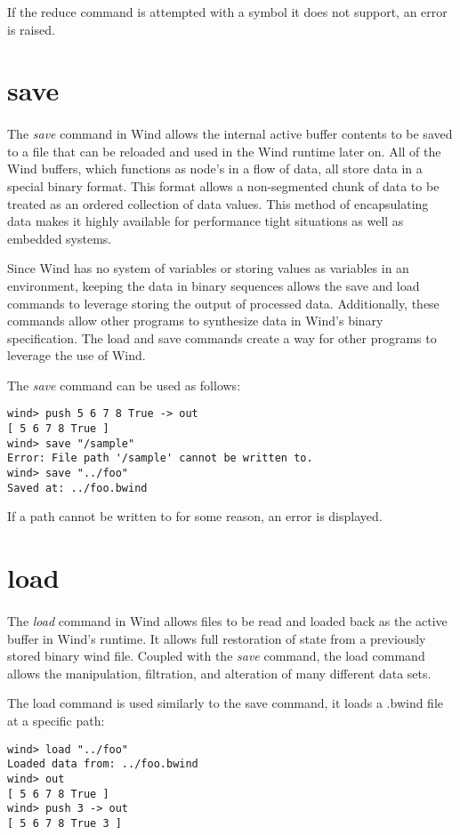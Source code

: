 \par If the reduce command is attempted with a symbol it does not support, an error is raised.

\section{save}

\paragraph{  } The \emph{save} command in Wind allows the internal active buffer contents to be saved to a file that can be reloaded and used in the Wind runtime later on. All of the Wind buffers, which functions as node's in a flow of data, all store data in a special binary format. This format allows a non-segmented chunk of data to be treated as an ordered collection of data values. This method of encapsulating data makes it highly available for performance tight situations as well as embedded systems.
\par Since Wind has no system of variables or storing values as variables in an environment, keeping the data in binary sequences allows the save and load commands to leverage storing the output of processed data. Additionally, these commands allow other programs to synthesize data in Wind's binary specification. The load and save commands create a way for other programs to leverage the use of Wind.
\par The \emph{save} command can be used as follows: \\

\begin{verbatim}
wind> push 5 6 7 8 True -> out
[ 5 6 7 8 True ]
wind> save "/sample"
Error: File path '/sample' cannot be written to.
wind> save "../foo"
Saved at: ../foo.bwind
\end{verbatim}

\par If a path cannot be written to for some reason, an error is displayed.

\section{load}

\paragraph{  } The \emph{load} command in Wind allows  files to be read and loaded back as the active buffer in Wind's runtime. It allows full restoration of state from a previously stored binary wind file. Coupled with the \emph{save} command, the load command allows the manipulation, filtration, and alteration of many different data sets. 
\par The load command is used similarly to the save command, it loads a .bwind file at a specific path:

\begin{verbatim}
wind> load "../foo"
Loaded data from: ../foo.bwind
wind> out
[ 5 6 7 8 True ]
wind> push 3 -> out
[ 5 6 7 8 True 3 ]
\end{verbatim}
